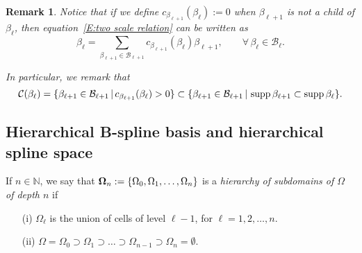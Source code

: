 \documentclass[a4paper]{siamltex1213}
\newtheorem{remark}[theorem]{Remark}
\newcommand\NN{\mathbb N}
\newcommand\BB{\mathcal B}
\newcommand\CC{\mathcal C}
\begin{document}
\begin{remark}
Notice that if we define $c_{\beta_{\ell+1}}(\beta_\ell):=0$ when $\beta_{\ell+1}$ is not a child of $\beta_\ell$, then equation~\eqref{E:two scale relation} can be written as
\begin{equation}\label{E:two scale relation 2}
 \beta_\ell = \sum_{\beta_{\ell+1}\in\BB_{\ell+1}} 
c_{\beta_{\ell+1}}(\beta_\ell)\beta_{\ell+1}, 
\qquad \forall\,\beta_\ell\in\BB_\ell.
\end{equation}

In particular, we remark that
\begin{equation}\label{E:set of children}
\CC(\beta_\ell)=\{\beta_{\ell+1}\in\BB_{\ell+1}\,|\,c_{\beta_{\ell+1}}(\beta_\ell)>0\}\subset\{\beta_{\ell+1}\in\BB_{\ell+1}\,|\,\supp\beta_{\ell+1}\subset\supp\beta_\ell\}.
\end{equation}

\end{remark}

\subsection{Hierarchical B-spline basis and hierarchical spline space}

\begin{definition} 
If $n\in\NN$, 
we say that ${\bf\Omega}_n := \{\Omega_0,\Omega_1,\dots,\Omega_n\}$ is a 
\emph{hierarchy of subdomains of $\Omega$ of depth $n$} if
\begin{enumerate}
 \item[(i)] $\Omega_\ell$ is the union of cells of level 
$\ell-1$, for $\ell = 1,2,\dots,n$.
 \item[(ii)]$\Omega = \Omega_0 \supset \Omega_1 \supset \dots \supset 
\Omega_{n-1}\supset \Omega_n = \emptyset$.
\end{enumerate} 
\end{definition}
\end{document}
